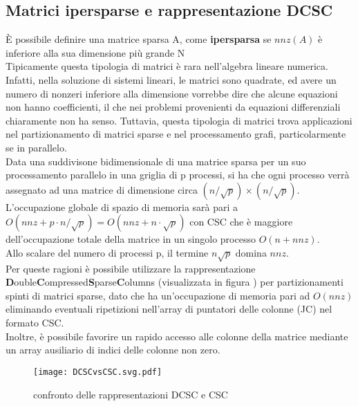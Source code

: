 \subsection{Matrici ipersparse e rappresentazione DCSC}
È possibile definire una matrice sparsa A, come {\bf ipersparsa }se $nnz(A)$ è
inferiore alla sua dimensione più grande N  \\ %
Tipicamente questa tipologia di matrici è rara nell'algebra lineare numerica.
Infatti, nella soluzione di sistemi lineari, le matrici sono quadrate, ed avere un numero di nonzeri inferiore alla dimensione 
vorrebbe dire che alcune equazioni non hanno coefficienti, 
il che nei problemi provenienti da equazioni differenziali chiaramente non ha senso.
Tuttavia, questa tipologia di matrici trova applicazioni nel partizionamento di matrici sparse 
e nel processamento grafi, particolarmente se in parallelo.\\
\voidLine
Data una suddivisone bidimensionale di una matrice sparsa %
per un suo processamento parallelo in una griglia di p processi, si ha che ogni processo
verrà assegnato ad una matrice di dimensione circa $(n/\sqrt{p})\times(n/\sqrt{p})$.\\ %
L'occupazione globale di spazio di memoria sarà pari a 
$O(nnz + p \cdot n/\sqrt{p}) = O(nnz + n \cdot \sqrt{p})$ con CSC che è maggiore
dell'occupazione totale della matrice in un singolo processo $O(n + nnz)$.\\
Allo scalare del numero di processi p, il termine $n\sqrt{p}$ domina $nnz$.\\
\voidLine
Per queste ragioni è possibile utilizzare la rappresentazione \\
{\small {\bf D}ouble{\bf C}ompressed{\bf S}parse{\bf C}olumns} (visualizzata in figura )
per partizionamenti spinti di matrici sparse,
dato che ha un'occupazione di memoria pari ad $O(nnz)$
eliminando eventuali ripetizioni nell'array di puntatori delle colonne (JC) nel formato CSC.\\
Inoltre, è possibile favorire un rapido accesso alle colonne della matrice mediante un
array ausiliario di indici delle colonne non zero.
\begin{figure}[H]
  \centering \texttt{[image: DCSCvsCSC.svg.pdf]} 
  \caption[DCSC vs CSC]{confronto delle rappresentazioni DCSC e CSC}
  \decoRule \label{fig:DCSCvsCSC}
\end{figure}

